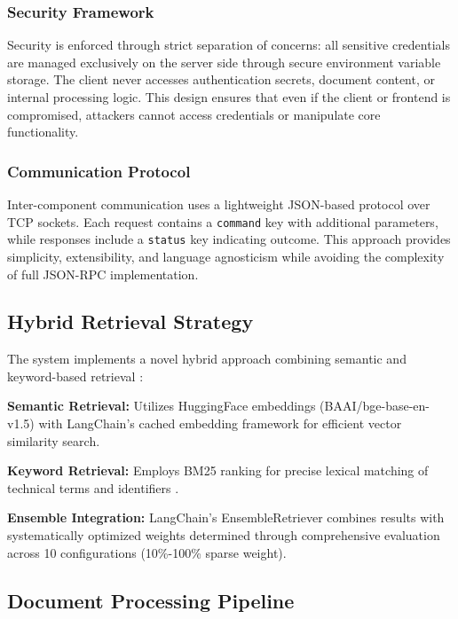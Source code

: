 \documentclass[11pt]{article}
\begin{document}
\subsubsection{Security Framework}

Security is enforced through strict separation of concerns: all sensitive credentials are managed exclusively on the server side through secure environment variable storage. The client never accesses authentication secrets, document content, or internal processing logic. This design ensures that even if the client or frontend is compromised, attackers cannot access credentials or manipulate core functionality.

\subsubsection{Communication Protocol}

Inter-component communication uses a lightweight JSON-based protocol over TCP sockets. Each request contains a \texttt{command} key with additional parameters, while responses include a \texttt{status} key indicating outcome. This approach provides simplicity, extensibility, and language agnosticism while avoiding the complexity of full JSON-RPC implementation.

\subsection{Hybrid Retrieval Strategy}

The system implements a novel hybrid approach combining semantic and keyword-based retrieval \cite{hybridretrieval}:

\textbf{Semantic Retrieval:} Utilizes HuggingFace embeddings (BAAI/bge-base-en-v1.5) \cite{bgeembeddings} with LangChain's cached embedding framework \cite{langchainjs} for efficient vector similarity search.

\textbf{Keyword Retrieval:} Employs BM25 ranking for precise lexical matching of technical terms and identifiers \cite{hybridretrieval}.

\textbf{Ensemble Integration:} LangChain's EnsembleRetriever \cite{langchainjs} combines results with systematically optimized weights determined through comprehensive evaluation across 10 configurations (10\%-100\% sparse weight).

\subsection{Document Processing Pipeline}
\end{document}
